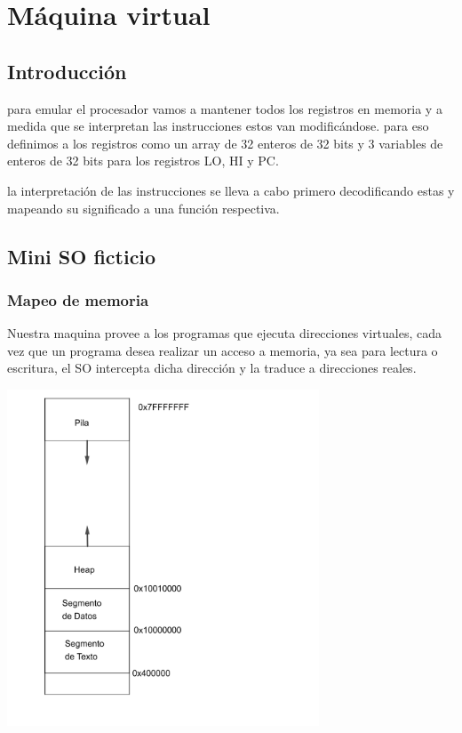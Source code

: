 \documentclass[12pt]{article}
\begin{document}
   
\section{Máquina virtual}
\subsection{Introducción}
para emular el procesador vamos a mantener todos los registros en memoria y a
medida que se interpretan las instrucciones estos van modificándose.
para eso definimos a los registros como un array de 32 enteros de 32 bits
y 3 variables de enteros de 32 bits para  los registros LO, HI y PC.

la interpretación de las instrucciones se lleva a cabo primero decodificando
estas y mapeando su significado a una función respectiva.
\subsection{Mini SO ficticio}
\subsubsection{Mapeo de memoria}
Nuestra maquina provee a los programas que ejecuta direcciones virtuales,
cada vez que un programa desea realizar un acceso a memoria, ya sea para lectura o escritura,
el SO intercepta dicha dirección y la traduce a direcciones reales. 

\begin{center}
\includegraphics[height=10cm]{mdetails.png}
\end{center}
\end{document}
